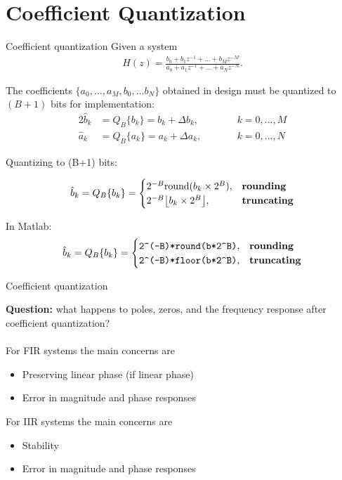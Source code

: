 \documentclass[10pt]{beamer}
\begin{document}
%
\section{Coefficient Quantization}
\begin{frame}{Coefficient quantization}
	Given a system
	\begin{align*}
		H(z) = \frac{b_0 + b_1z^{-1} + \ldots + b_Mz^{-M}}{a_0 + a_1z^{-1} + \ldots + a_Nz^{-N}}.
	\end{align*}
	
	The coefficients $\{a_0, \ldots, a_M, b_0,\ldots b_N\}$ obtained in design must  be quantized to $(B+1)$ bits for implementation:
	\begin{alignat*}{2}
		\hat{b}_k &= Q_B\{b_k\} = b_k + \Delta b_k, \qquad &&  k = 0, \ldots, M \\
		\hat{a}_k &= Q_B\{a_k\} = a_k + \Delta a_k, \qquad && k = 0, \ldots, N
	\end{alignat*}
	
	\pause
	\vspace{0.25cm}
	Quantizing to (B+1) bits:
	
	\begin{equation*}
	\hat{b}_k = Q_B\{b_k\} = \begin{cases}
	2^{-B}\mathrm{round}(b_k\times 2^B), & \text{\textbf{rounding}} \\
	2^{-B}\big\lfloor b_k\times 2^B\big\rfloor, & \text{\textbf{truncating}}
	\end{cases}
	\end{equation*}
	
	In Matlab:
	\begin{equation*}
	\hat{b}_k = Q_B\{b_k\} = \begin{cases}
	\texttt{2\textasciicircum(-B)*round(b*2\textasciicircum B)}, & \text{\textbf{rounding}} \\
	\texttt{2\textasciicircum(-B)*floor(b*2\textasciicircum B)}, & \text{\textbf{truncating}}
	\end{cases}
	\end{equation*}
\end{frame}

\begin{frame}{Coefficient quantization}

\textbf{Question:} what happens to poles, zeros, and the frequency response after coefficient quantization?
~\\
~\\

For FIR systems the main concerns are
\begin{itemize}
	\item Preserving linear phase (if linear phase)
	\item Error in magnitude and phase responses
\end{itemize}

For IIR systems the main concerns are
\begin{itemize}
	\item Stability
	\item Error in magnitude and phase responses
\end{itemize}

\end{frame}
\end{document}
